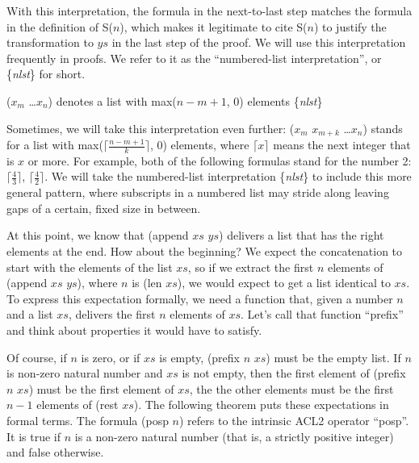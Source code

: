 With this interpretation, the formula in the next-to-last step matches the formula in the definition of S($n$), which makes it legitimate to cite S($n$) to justify the transformation to $ys$ in the last step of the proof. We will use this interpretation frequently in proofs. We refer to it as the ``numbered-list interpretation'', or \{\emph{nlst}\} for short.

\label{numbered-list-interpretation}
\begin{center}
($x_m$ \dots $x_n$) denotes a list with max($n-m+1$, 0) elements \{\emph{nlst}\}
\end{center}

\begin{comment}
\todo{Rex: We may want to skip this paragraph for now.  We can introduce this notation later, when needed.}
\end{comment}
Sometimes, we will take this interpretation even further: ($x_m$ $x_{m+k}$ \dots $x_n$) stands for a list with
max($\lceil \frac{n - m + 1}{k} \rceil$, 0)
elements, where $\lceil x \rceil$ means the next integer that is $x$ or more. For example, both of the following formulas stand for the number 2: $\lceil \frac {4}{3}\rceil$, $\lceil \frac {4}{2}\rceil$. We will take the numbered-list interpretation \{\emph{nlst}\} to include this more general pattern, where subscripts in a numbered list may stride along leaving gaps of a certain, fixed size in between.

At this point, we know that (append $xs$ $ys$) delivers a list that has the right elements at the end. How about the beginning? We expect the concatenation to start with the elements of the list $xs$, so if we extract the first $n$ elements of (append $xs$ $ys$), where $n$ is (len $xs$), we would expect to get a list identical to $xs$. To express this expectation formally, we need a function that, given a number $n$ and a list $xs$, delivers the first $n$ elements of $xs$. Let's call that function ``prefix'' and think about properties it would have to satisfy.

Of course, if $n$ is zero, or if $xs$ is empty, (prefix $n$ $xs$) must be the empty list. If $n$ is non-zero natural number and $xs$ is not empty, then the first element of (prefix $n$ $xs$) must be the first element of $xs$, the the other elements must be the first $n-1$ elements of (rest $xs$). The following theorem puts these expectations in formal terms. The formula (posp $n$) refers to the intrinsic ACL2 operator ``posp''. It is true if $n$ is a non-zero natural number (that is, a strictly positive integer) and false otherwise.


